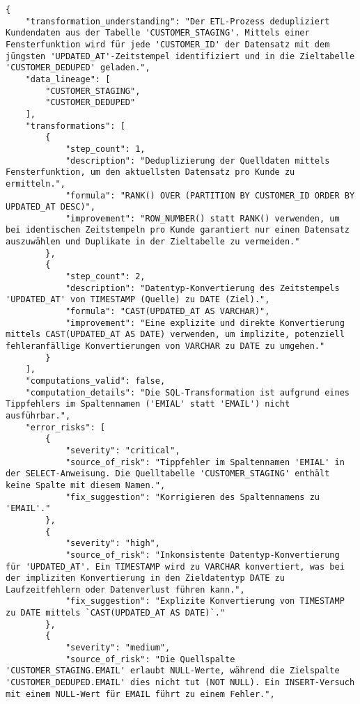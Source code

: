 \begin{lstlisting}[caption={Ausgabe: GEMINI 2.5 Pro Anwendungsfall 2 Konsistenzdurchlauf},label={gemini_case2_prompt2}]
{
    "transformation_understanding": "Der ETL-Prozess dedupliziert Kundendaten aus der Tabelle 'CUSTOMER_STAGING'. Mittels einer Fensterfunktion wird für jede 'CUSTOMER_ID' der Datensatz mit dem jüngsten 'UPDATED_AT'-Zeitstempel identifiziert und in die Zieltabelle 'CUSTOMER_DEDUPED' geladen.",
    "data_lineage": [
        "CUSTOMER_STAGING",
        "CUSTOMER_DEDUPED"
    ],
    "transformations": [
        {
            "step_count": 1,
            "description": "Deduplizierung der Quelldaten mittels Fensterfunktion, um den aktuellsten Datensatz pro Kunde zu ermitteln.",
            "formula": "RANK() OVER (PARTITION BY CUSTOMER_ID ORDER BY UPDATED_AT DESC)",
            "improvement": "ROW_NUMBER() statt RANK() verwenden, um bei identischen Zeitstempeln pro Kunde garantiert nur einen Datensatz auszuwählen und Duplikate in der Zieltabelle zu vermeiden."
        },
        {
            "step_count": 2,
            "description": "Datentyp-Konvertierung des Zeitstempels 'UPDATED_AT' von TIMESTAMP (Quelle) zu DATE (Ziel).",
            "formula": "CAST(UPDATED_AT AS VARCHAR)",
            "improvement": "Eine explizite und direkte Konvertierung mittels CAST(UPDATED_AT AS DATE) verwenden, um implizite, potenziell fehleranfällige Konvertierungen von VARCHAR zu DATE zu umgehen."
        }
    ],
    "computations_valid": false,
    "computation_details": "Die SQL-Transformation ist aufgrund eines Tippfehlers im Spaltennamen ('EMIAL' statt 'EMAIL') nicht ausführbar.",
    "error_risks": [
        {
            "severity": "critical",
            "source_of_risk": "Tippfehler im Spaltennamen 'EMIAL' in der SELECT-Anweisung. Die Quelltabelle 'CUSTOMER_STAGING' enthält keine Spalte mit diesem Namen.",
            "fix_suggestion": "Korrigieren des Spaltennamens zu 'EMAIL'."
        },
        {
            "severity": "high",
            "source_of_risk": "Inkonsistente Datentyp-Konvertierung für 'UPDATED_AT'. Ein TIMESTAMP wird zu VARCHAR konvertiert, was bei der impliziten Konvertierung in den Zieldatentyp DATE zu Laufzeitfehlern oder Datenverlust führen kann.",
            "fix_suggestion": "Explizite Konvertierung von TIMESTAMP zu DATE mittels `CAST(UPDATED_AT AS DATE)`."
        },
        {
            "severity": "medium",
            "source_of_risk": "Die Quellspalte 'CUSTOMER_STAGING.EMAIL' erlaubt NULL-Werte, während die Zielspalte 'CUSTOMER_DEDUPED.EMAIL' dies nicht tut (NOT NULL). Ein INSERT-Versuch mit einem NULL-Wert für EMAIL führt zu einem Fehler.",

\end{lstlisting}
